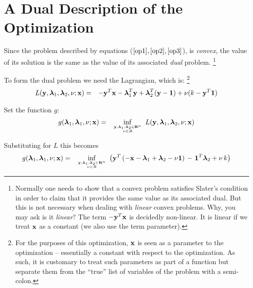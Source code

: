 \documentclass[12pt]{article}
\begin{document}
\section{A Dual Description of the Optimization}
Since the problem described by equations ($\ref{op1}, \ref{op2}, \ref{op3}$), is
{\it convex\/}, the value of its solution is the same as the value of 
its associated {\it dual\/} problem.%
\footnote{Normally one needs to show that a convex problem satisfies Slater's condition
	in order to claim that it provides the same value as its associated dual.
But this is not necessary when dealing with {\it linear\/} convex problems. 
Why, you may ask is it {\it linear\/}? The term $-{\bf y}^T {\bf x}$ is
decidedly non-linear. It is linear if we treat ${\bf x}$ as a constant (we also
use the term parameter).}

To form the dual problem we need the Lagrangian, which is:%
\footnote{For the purposes of this optimization, ${\bf x}$ is seen as a parameter
to the optimization -- essentially a constant with respect to the optimization.
As such, it is customary to treat such parameters as part of a function but separate
them from the ``true'' list of variables of the problem with a semi-colon.}
\begin{eqnarray}
	L({\bf y}, {\boldsymbol \lambda}_1, {\boldsymbol \lambda}_2, \nu; {\bf x}) &=& 
	-{\bf y}^T {\bf x} - {\boldsymbol \lambda}_1^T {\bf y} + {\boldsymbol \lambda}_2^T ({\bf y} - {\bf 1}) + \nu (k - {\bf y}^T {\bf 1}) 
\end{eqnarray}

Set the function $g$:
\begin{eqnarray}
	g({\boldsymbol \lambda}_1, {\boldsymbol \lambda}_1, \nu; {\bf x}) &=& 
		\mathop{\rm inf}_{{{\bf y}, {\boldsymbol \lambda}_1, {\boldsymbol \lambda}_2 \in {\bf R}^n} \atop \nu \in R} 
		\; L({\bf y}, {\boldsymbol \lambda}_1, {\boldsymbol \lambda}_2, \nu; {\bf x}) 
\end{eqnarray}

Substituting for $L$ this becomes
\begin{eqnarray}
	g({\boldsymbol \lambda}_1, {\boldsymbol \lambda}_1, \nu; {\bf x}) &=& 
		\mathop{\rm inf}_{{{\bf y}, {\boldsymbol \lambda}_1, {\boldsymbol \lambda}_2 \in {\bf R}^n} \atop \nu \in R} 
		\; \left({\bf y}^T \left( -{\bf x} - {\boldsymbol \lambda}_1 + {\boldsymbol \lambda}_2 - \nu {\bf 1} \right) \right.
		- \left. {\bf 1}^T {\boldsymbol \lambda}_2 + \nu \, k  \right)
\end{eqnarray}
\end{document}
